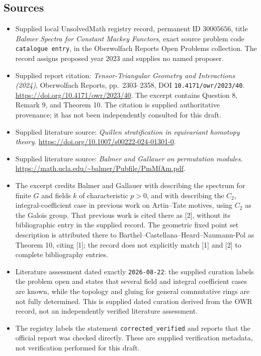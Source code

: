 \documentclass[11pt]{article}
\begin{document}
\subsection{Sources}
\begin{itemize}
\item Supplied local UnsolvedMath registry record, permanent ID \(30005656\), title \emph{Balmer Spectra for Constant Mackey Functors}, exact source problem code \texttt{catalogue entry}, in the Oberwolfach Reports Open Problems collection. The record assigns proposed year 2023 and supplies no named proposer.
\item Supplied report citation: \emph{Tensor-Triangular Geometry and Interactions (2024)}, Oberwolfach Reports, pp.\ 2303--2358, DOI \texttt{10.4171/owr/2023/40}. \url{https://doi.org/10.4171/owr/2023/40}. The excerpt contains Question 8, Remark 9, and Theorem 10. The citation is supplied authoritative provenance; it has not been independently consulted for this draft.
\item Supplied literature source: \emph{Quillen stratification in equivariant homotopy theory}. \url{https://doi.org/10.1007/s00222-024-01301-0}.
\item Supplied literature source: \emph{Balmer and Gallauer on permutation modules}. \url{https://math.ucla.edu/~balmer/Pubfile/PmMfAm.pdf}.
\item The excerpt credits Balmer and Gallauer with describing the spectrum for finite \(G\) and fields \(k\) of characteristic \(p>0\), and with describing the \(C_2\), integral-coefficient case in previous work on Artin--Tate motives, using \(C_2\) as the Galois group. That previous work is cited there as [2], without its bibliographic entry in the supplied record. The geometric fixed point set description is attributed there to Barthel--Castellana--Heard--Naumann-Pol as Theorem 10, citing [1]; the record does not explicitly match [1] and [2] to complete bibliography entries.
\item Literature assessment dated exactly \texttt{2026-08-22}: the supplied curation labels the problem open and states that several field and integral coefficient cases are known, while the topology and gluing for general commutative rings are not fully determined. This is supplied dated curation derived from the OWR record, not an independently verified literature assessment.
\item The registry labels the statement \texttt{corrected\_verified} and reports that the official report was checked directly. These are supplied verification metadata, not verification performed for this draft.
\end{itemize}
\end{document}

